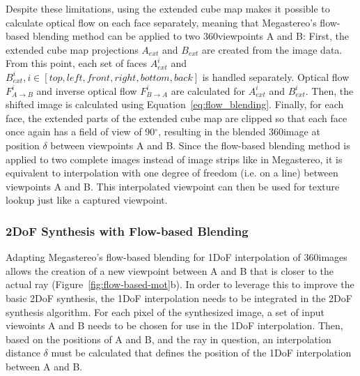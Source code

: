 Despite these limitations, using the extended cube map makes it possible to calculate optical flow on each face separately, meaning that Megastereo's flow-based blending method can be applied to two 360\degree viewpoints A and B: First, the extended cube map projections $A_{ext}$ and $B_{ext}$ are created from the image data. From this point, each set of faces $A_{ext}^{i}$ and $B_{ext}^{i}, i \in [top, left, front, right, bottom, back]$ is handled separately. Optical flow $F_{A\to B}^i$ and inverse optical flow $F_{B\to A}^i$ are calculated for $A_{ext}^{i}$ and $B_{ext}^{i}$. Then, the shifted image is calculated using Equation~\ref{eq:flow_blending}. Finally, for each face, the extended parts of the extended cube map are clipped so that each face once again has a field of view of 90$^{\circ}$, resulting in the blended 360\degree image at position $\delta$ between viewpoints A and B. Since the flow-based blending method is applied to two complete images instead of image strips like in Megastereo, it is equivalent to interpolation with one degree of freedom (i.e. on a line) between viewpoints A and B. This interpolated viewpoint can then be used for texture lookup just like a captured viewpoint.

\subsubsection{2DoF Synthesis with Flow-based Blending} \label{subsec:2dof_flow-based}
Adapting Megastereo's flow-based blending for 1DoF interpolation of 360\degree images allows the creation of a new viewpoint between A and B that is closer to the actual ray (Figure~\ref{fig:flow-based-mot}b). In order to leverage this to improve the basic 2DoF synthesis, the 1DoF interpolation needs to be integrated in the 2DoF synthesis algorithm. For each pixel of the synthesized image, a set of input viewoints A and B needs to be chosen for use in the 1DoF interpolation. Then, based on the positions of A and B, and the ray in question, an interpolation distance $\delta$ must be calculated that defines the position of the 1DoF interpolation between A and B.

